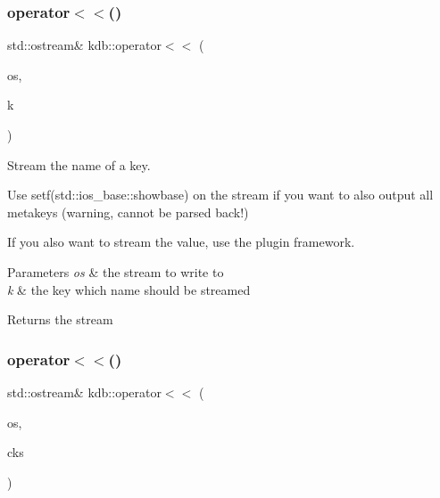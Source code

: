\subsubsection{\texorpdfstring{operator$<$$<$()}{operator<<()}\hspace{0.1cm}{\footnotesize\ttfamily [1/2]}}
{\footnotesize\ttfamily std\+::ostream\& kdb\+::operator$<$$<$ (\begin{DoxyParamCaption}\item[{std\+::ostream \&}]{os,  }\item[{\hyperlink{classkdb_1_1Key}{kdb\+::\+Key} const \&}]{k }\end{DoxyParamCaption})\hspace{0.3cm}{\ttfamily [inline]}}



Stream the name of a key. 

Use setf(std\+::ios\+\_\+base\+::showbase) on the stream if you want to also output all metakeys (warning, cannot be parsed back!)

If you also want to stream the value, use the plugin framework.


\begin{DoxyParams}{Parameters}
{\em os} & the stream to write to \\
\hline
{\em k} & the key which name should be streamed\\
\hline
\end{DoxyParams}
\begin{DoxyReturn}{Returns}
the stream 
\end{DoxyReturn}
\mbox{\label{namespacekdb_afd28754a48d420d2f2a41c5d8242f3fb}} 
\subsubsection{\texorpdfstring{operator$<$$<$()}{operator<<()}\hspace{0.1cm}{\footnotesize\ttfamily [2/2]}}
{\footnotesize\ttfamily std\+::ostream\& kdb\+::operator$<$$<$ (\begin{DoxyParamCaption}\item[{std\+::ostream \&}]{os,  }\item[{\hyperlink{classkdb_1_1KeySet}{kdb\+::\+Key\+Set} const \&}]{cks }\end{DoxyParamCaption})\hspace{0.3cm}{\ttfamily [inline]}}



